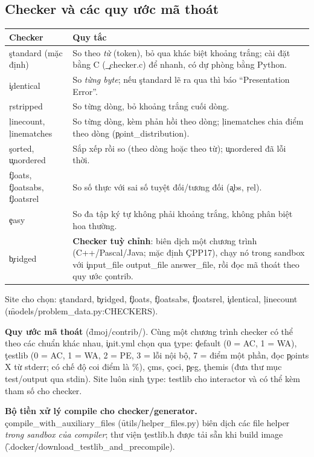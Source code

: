 \subsection{Checker và các quy ước mã thoát}
\begin{center}\small
\begin{tabularx}{\textwidth}{@{}L{3.1cm}Y@{}}
\toprule
Checker & Quy tắc \\
\midrule
\c{standard} (mặc định) & So theo \emph{từ} (token), bỏ qua khác biệt khoảng trắng; cài đặt bằng C (\c{_checker.c}) để nhanh, có dự phòng bằng Python. \\
\c{identical} & So \emph{từng byte}; nếu \c{standard} lẽ ra qua thì báo ``Presentation Error''. \\
\c{rstripped} & So từng dòng, bỏ khoảng trắng cuối dòng. \\
\c{linecount}, \c{linematches} & So từng dòng, kèm phản hồi theo dòng; \c{linematches} chia điểm theo dòng (\c{point_distribution}). \\
\c{sorted}, \c{unordered} & Sắp xếp rồi so (theo dòng hoặc theo từ); \c{unordered} đã lỗi thời. \\
\c{floats}, \c{floatsabs}, \c{floatsrel} & So số thực với sai số tuyệt đối/tương đối (\c{abs}, \c{rel}). \\
\c{easy} & So đa tập ký tự không phải khoảng trắng, không phân biệt hoa thường. \\
\c{bridged} & \textbf{Checker tuỳ chỉnh}: biên dịch một chương trình (C++/Pascal/Java; mặc định \c{CPP17}), chạy nó trong sandbox với \c{input_file output_file answer_file}, rồi đọc mã thoát theo quy ước \c{contrib}. \\
\bottomrule
\end{tabularx}
\end{center}
Site cho chọn: \c{standard}, \c{bridged}, \c{floats}, \c{floatsabs}, \c{floatsrel}, \c{identical}, \c{linecount} (\f{models/problem_data.py:CHECKERS}). \tS

\textbf{Quy ước mã thoát} (\f{dmoj/contrib/}). Cùng một chương trình checker có thể theo các chuẩn khác nhau, \c{init.yml} chọn qua \c{type}: \c{default} (0 = AC, 1 = WA), \c{testlib} (0 = AC, 1 = WA, 2 = PE, 3 = lỗi nội bộ, 7 = điểm một phần, đọc \c{points X} từ stderr; có chế độ coi điểm là \%), \c{cms}, \c{coci}, \c{peg}, \c{themis} (đưa thư mục test/output qua stdin). Site luôn sinh \c{type: testlib} cho interactor và có thể kèm tham số cho checker. \tS

\textbf{Bộ tiền xử lý compile cho checker/generator.} \c{compile_with_auxiliary_files} (\f{utils/helper_files.py}) biên dịch các file helper \emph{trong sandbox của compiler}; thư viện \c{testlib.h} được tải sẵn khi build image (\f{.docker/download_testlib_and_precompile}). \tS

